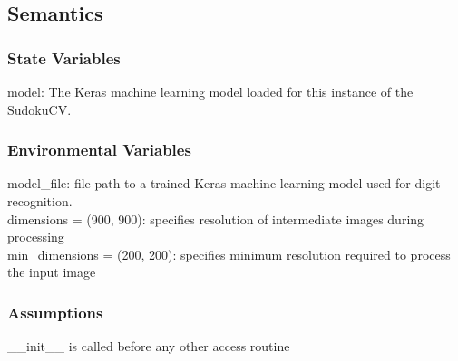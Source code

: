 \documentclass[11pt]{article}
\begin{document}
		\subsection{Semantics}
		\subsubsection{State Variables}
		model: The Keras machine learning model loaded for this instance of the SudokuCV.
		
		\subsubsection{Environmental Variables}
		model\_file: file path to a trained Keras machine learning model used for digit recognition. \\
		dimensions = (900, 900): specifies resolution of intermediate images during processing\\
		min\_dimensions = (200, 200): specifies minimum resolution required to process the input image\\
		
		\subsubsection{Assumptions}
		\_\_init\_\_ is called before any other access routine
		
\end{document}

